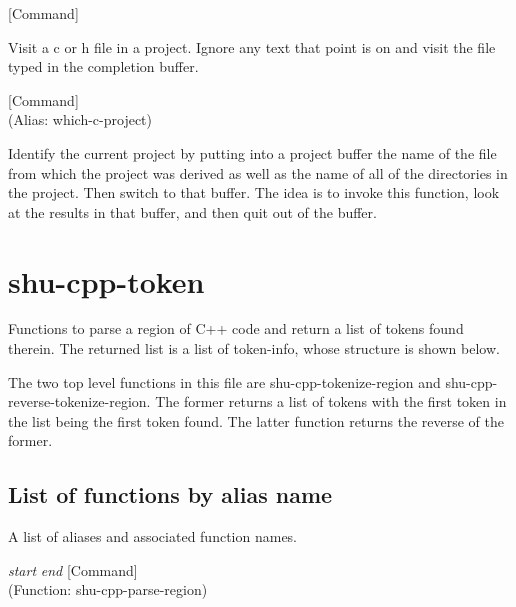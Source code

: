 \vspace{1em}
\noindent
{}
\usebox{\funcname}
 \hfill [Command]

\begin{doc-string}
Visit a c or h file in a project.  Ignore any text that point is on and visit the
file typed in the completion buffer.
\end{doc-string}

\vspace{1em}
\noindent
{}
\usebox{\funcname}
 \hfill [Command]\\%
 (Alias: which-c-project)

\begin{doc-string}
Identify the current project by putting into a project buffer the name of the file
from which the project was derived as well as the name of all of the directories in the
project.  Then switch to that buffer.  The idea is to invoke this function, look at the
results in that buffer, and then quit out of the buffer.
\end{doc-string}

\eject
\section{shu-cpp-token}


Functions to parse a region of C++ code and return a list of tokens
found therein.  The returned list is a list of token-info, whose structure
is shown below.

The two top level functions in this file are shu-cpp-tokenize-region and
shu-cpp-reverse-tokenize-region.  The former returns a list of tokens with the
first token in the list being the first token found.  The latter function
returns the reverse of the former.


\subsection{List of functions by alias name}

A list of aliases and associated function names.



\vspace{1em}
\noindent
{}
\usebox{\funcname}\emph{start} \emph{end}
 \hfill [Command]\\%
 (Function: shu-cpp-parse-region)

